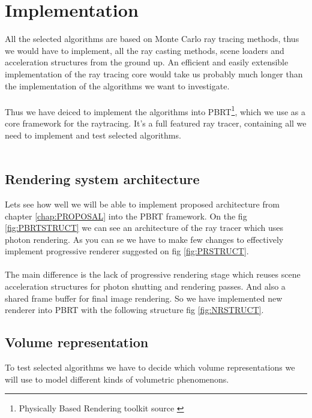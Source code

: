\chapter{Implementation}
\label{chap:IMPLEM}
All the selected algorithms are based on Monte Carlo ray tracing methods, thus we would have to implement, all the ray casting methods, scene loaders and acceleration structures from the ground up. An efficient and easily extensible implementation of the ray tracing core would take us probably much longer than the implementation of the algorithms we want to investigate.
\\
\\
Thus we have deiced to implement the algorithms into PBRT\footnote{Physically Based Rendering toolkit source \cite{PBRT}}, which we use as a core framework for the raytracing. It's a full featured ray tracer, containing all we need to implement and test selected algorithms.
\\
\\
\section{Rendering system architecture}
Lets see how well we will be able to implement proposed architecture from chapter \ref{chap:PROPOSAL} into the PBRT framework. On the fig \ref{fig:PBRTSTRUCT} we can see an architecture of the ray tracer which uses photon rendering. As you can se we have to make few changes to effectively implement progressive renderer suggested on fig \ref{fig:PRSTRUCT}.
\\
\\
The main difference is the lack of progressive rendering stage which reuses scene acceleration structures for photon shutting and rendering passes. And also a shared frame buffer for final image rendering. So we have implemented new renderer into PBRT with the following structure fig \ref{fig:NRSTRUCT}.



\section{Volume representation}
To test selected algorithms we have to decide which volume representations we will use to model different kinds of volumetric phenomenons.

